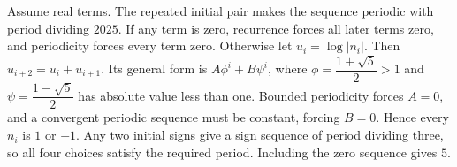 Assume real terms. The repeated initial pair makes the sequence periodic with period dividing $2025$. If any term is zero, recurrence forces all later terms zero, and periodicity forces every term zero. Otherwise let $u_i=\log|n_i|$. Then $u_{i+2}=u_i+u_{i+1}$. Its general form is $A\phi^i+B\psi^i$, where $\phi=\dfrac{1+\sqrt5}{2}>1$ and $\psi=\dfrac{1-\sqrt5}{2}$ has absolute value less than one. Bounded periodicity forces $A=0$, and a convergent periodic sequence must be constant, forcing $B=0$. Hence every $n_i$ is $1$ or $-1$. Any two initial signs give a sign sequence of period dividing three, so all four choices satisfy the required period. Including the zero sequence gives $\boxed5$.
